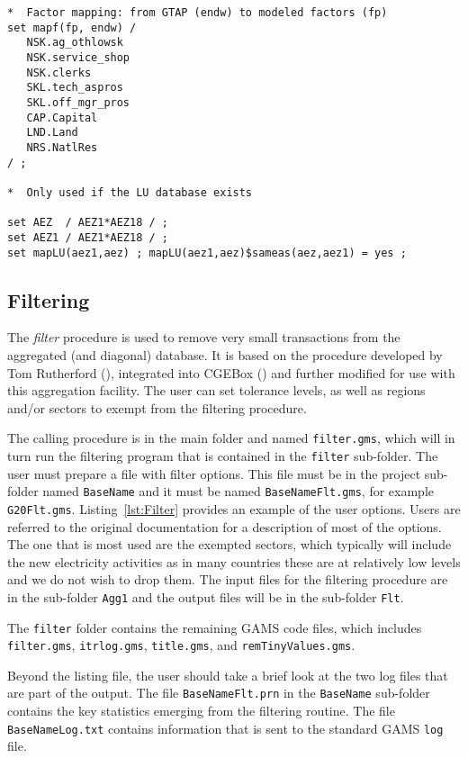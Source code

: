 \begin{lstlisting}[language=GAMS, caption={Mapping file for primary aggregation}, label=lst:PrimAgg]
*  Factor mapping: from GTAP (endw) to modeled factors (fp)
set mapf(fp, endw) /
   NSK.ag_othlowsk
   NSK.service_shop
   NSK.clerks
   SKL.tech_aspros
   SKL.off_mgr_pros
   CAP.Capital
   LND.Land
   NRS.NatlRes
/ ;

*  Only used if the LU database exists

set AEZ  / AEZ1*AEZ18 / ;
set AEZ1 / AEZ1*AEZ18 / ;
set mapLU(aez1,aez) ; mapLU(aez1,aez)$sameas(aez,aez1) = yes ;
\end{lstlisting}


\subsection{Filtering}

The \emph{filter} procedure is used to remove very small transactions
from the aggregated (and diagonal) database. It is based
on the procedure developed by Tom Rutherford (\cite{LanzRutherfordJGEA2016}),
integrated into CGEBox (\cite{BritzvdMJGEA2018}) and further
modified for use with this aggregation facility. The user
can set tolerance levels, as well as regions and/or sectors
to exempt from the filtering procedure.

The calling procedure is in the main folder and named \texttt{filter.gms},
which will in turn run the filtering program that is contained
in the \texttt{filter} sub-folder. The user must prepare
a file with filter options. This file must be in the project sub-folder
named \texttt{BaseName} and it must be named \texttt{BaseNameFlt.gms},
for example \texttt{G20Flt.gms}. Listing~\ref{lst:Filter} provides
an example of the user options. Users are referred to the original
documentation for a description of most of the options. The one
that is most used are the exempted sectors, which typically
will include the new electricity activities as in many
countries these are at relatively low levels and we do
not wish to drop them. The input files for the filtering
procedure are in the sub-folder \texttt{Agg1} and
the output files will be in the sub-folder \texttt{Flt}.

The \texttt{filter} folder contains the remaining GAMS code files,
which includes \texttt{filter.gms}, \texttt{itrlog.gms}, \texttt{title.gms},
and \texttt{remTinyValues.gms}.

Beyond the listing file, the user should take a brief look at the two log
files that are part of the output. The file \texttt{BaseNameFlt.prn} in
the \texttt{BaseName} sub-folder contains the key statistics emerging from
the filtering routine. The file \texttt{BaseNameLog.txt} contains
information that is sent to the standard GAMS \texttt{log} file.

